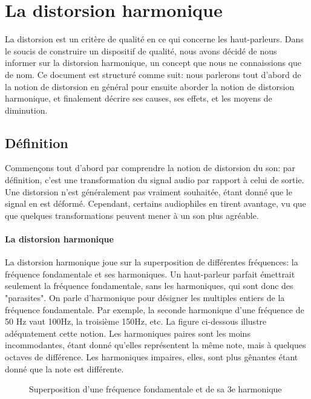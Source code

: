 

\section{La distorsion harmonique}

La distorsion est un critère de qualité en ce qui concerne les haut-parleurs.
Dans le soucis de construire un dispositif de qualité, nous avons décidé de 
nous informer sur la distorsion harmonique, un concept que nous ne connaissions
que de nom.
Ce document est structuré comme suit: nous parlerons tout d'abord de la notion  de distorsion 
en général pour ensuite aborder la notion  de distorsion 
harmonique, et finalement décrire ses causes, ses effets,
et les moyens de diminution.

\subsection{Définition}
Commençons tout d'abord par comprendre la notion de distorsion du son: par définition, c'est
une transformation du signal audio par rapport à celui de sortie. Une distorsion n'est généralement pas vraiment souhaitée, étant donné
que le signal en est déformé\cite{dico}. Cependant, certains audiophiles en tirent avantage, vu que que quelques
transformations peuvent mener à un son plus agréable\cite{encyclopedie}.

\paragraph{La distorsion harmonique}
La distorsion harmonique joue sur la superposition de différentes fréquences:
la fréquence fondamentale et ses harmoniques. Un haut-parleur parfait émettrait seulement la fréquence fondamentale, sans les harmoniques, qui sont donc des "parasites".
On parle d'harmonique pour désigner les multiples entiers de la fréquence fondamentale\cite{encyclopedia}.
Par exemple, la seconde harmonique d'une fréquence de 50 Hz vaut 100Hz, la troisième 150Hz, etc. La figure 
ci-dessous illustre adéquatement cette notion.
Les harmoniques paires sont les moins incommodantes, étant donné qu'elles représentent la même note, mais à quelques octaves de différence.
Les harmoniques impaires, elles, sont plus gênantes étant donné que la note est différente\cite{hartmann}.


\begin{figure}[ht!]
\centering
{}
\caption{Superposition d'une fréquence fondamentale et de sa 3e harmonique}
\label{lwp_ratio} 
\end{figure}

